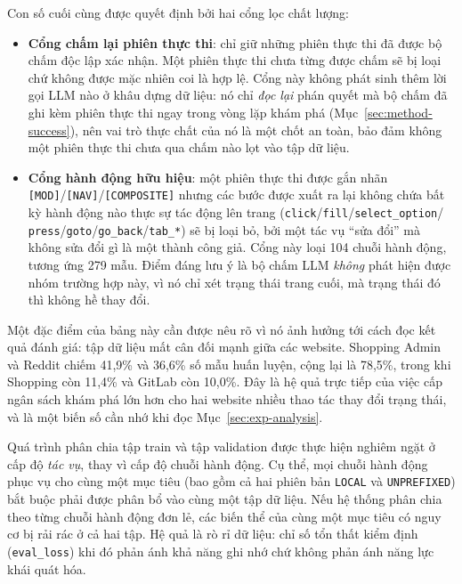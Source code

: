 Con số cuối cùng được quyết định bởi hai cổng lọc chất lượng:

\begin{itemize}
  \item \textbf{Cổng chấm lại phiên thực thi}: chỉ giữ những phiên thực thi đã được bộ chấm
    độc lập xác nhận. Một phiên thực thi chưa từng được chấm sẽ bị loại chứ không được
    mặc nhiên coi là hợp lệ. Cổng này không phát sinh thêm lời gọi LLM nào ở khâu
    dựng dữ liệu: nó chỉ \emph{đọc lại} phán quyết mà bộ chấm đã ghi kèm phiên thực thi
    ngay trong vòng lặp khám phá (Mục~\ref{sec:method-success}), nên vai trò thực
    chất của nó là một chốt an toàn, bảo đảm không một phiên thực thi chưa qua chấm nào
    lọt vào tập dữ liệu.
  \item \textbf{Cổng hành động hữu hiệu}: một phiên thực thi được gắn nhãn
    \texttt{[MOD]}\slash\texttt{[NAV]}\slash\texttt{[COMPOSITE]} nhưng các bước
    được xuất ra lại không chứa bất kỳ hành động nào thực sự tác động lên trang
    (\texttt{click}\slash\texttt{fill}\slash\texttt{select\_option}\slash
    \texttt{press}\slash\texttt{goto}\slash\texttt{go\_back}\slash\texttt{tab\_*})
    sẽ bị loại bỏ, bởi một tác vụ ``sửa đổi'' mà không sửa đổi gì là một thành
    công giả. Cổng này loại 104 chuỗi hành động, tương ứng 279 mẫu. Điểm đáng lưu ý là bộ chấm LLM \emph{không} phát hiện được nhóm trường hợp này, vì nó chỉ xét trạng thái trang cuối, mà trạng thái
    đó thì không hề thay đổi.
\end{itemize}

Một đặc điểm của bảng này cần được nêu rõ vì nó ảnh hưởng tới cách đọc kết quả đánh giá: tập dữ liệu mất cân đối mạnh giữa các website. Shopping Admin và Reddit chiếm 41{,}9\% và 36{,}6\% số mẫu huấn luyện, cộng lại là 78{,}5\%, trong khi Shopping còn 11{,}4\% và GitLab còn 10{,}0\%. Đây là hệ quả trực tiếp của việc cấp ngân sách khám phá lớn hơn cho hai website nhiều thao tác thay đổi trạng thái, và là một biến số cần nhớ khi đọc Mục~\ref{sec:exp-analysis}.

Quá trình phân chia tập train và tập validation được thực hiện nghiêm ngặt ở cấp độ \emph{tác vụ}, thay vì cấp độ chuỗi hành động. Cụ thể, mọi chuỗi hành động phục vụ cho cùng một mục tiêu (bao gồm cả hai phiên bản \texttt{LOCAL} và \texttt{UNPREFIXED}) bắt buộc phải được phân bổ vào cùng một tập dữ liệu. Nếu hệ thống phân chia theo từng chuỗi hành động đơn lẻ, các biến thể của cùng một mục tiêu có nguy cơ bị rải rác ở cả hai tập. Hệ quả là rò rỉ dữ liệu: chỉ số tổn thất kiểm định (\texttt{eval\_loss}) khi đó phản ánh khả năng ghi nhớ chứ không phản ánh năng lực khái quát hóa.

